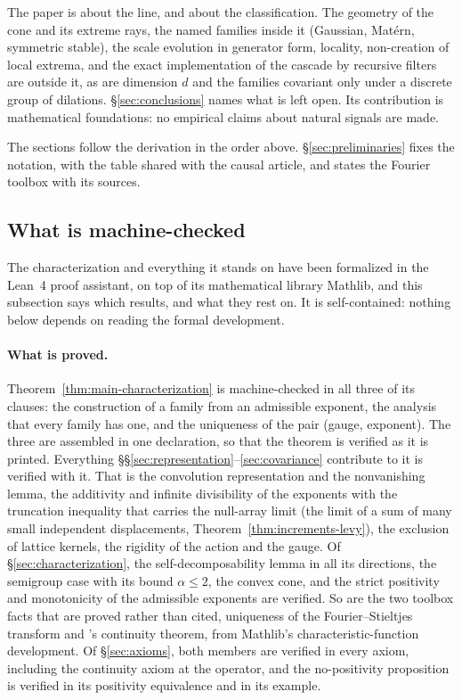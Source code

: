 The paper is about the line, and about the classification. The geometry of the cone and
its extreme rays, the named families inside it (Gaussian, Mat\'ern, symmetric stable),
the scale evolution in generator form, locality, non-creation of local extrema, and the
exact implementation of the cascade by recursive filters are outside it, as are dimension
$d$ and the families covariant only under a discrete group of dilations.
\S\ref{sec:conclusions} names what is left open. Its contribution is mathematical
foundations: no empirical claims about natural signals are made.

The sections follow the derivation in the order above. \S\ref{sec:preliminaries} fixes
the notation, with the table shared with the causal article, and states the Fourier
toolbox with its sources.

\subsection{What is machine-checked}\label{sec:machine-checked}

The characterization and everything it stands on have been formalized in the Lean~4 proof
assistant, on top of its mathematical library Mathlib, and this subsection says which
results, and what they rest on. It is self-contained: nothing below depends on
reading the formal development.

\paragraph{What is proved.} Theorem~\ref{thm:main-characterization} is machine-checked in
all three of its clauses: the construction of a family from an admissible exponent, the
analysis that every family has one, and the uniqueness of the pair (gauge, exponent). The
three are assembled in one declaration, so that the theorem is verified as it is printed.
Everything \S\S\ref{sec:representation}--\ref{sec:covariance} contribute to it is
verified with it. That is the convolution representation and the nonvanishing lemma, the
additivity and infinite divisibility of the exponents with the truncation inequality that
carries the null-array limit (the limit of a sum of many small independent displacements,
Theorem~\ref{thm:increments-levy}), the exclusion of lattice kernels, the
rigidity of the action and the gauge. Of \S\ref{sec:characterization}, the
self-decomposability lemma in all its directions, the semigroup case with its bound
$\alpha \le 2$, the convex cone, and the strict positivity and monotonicity of the
admissible exponents are verified. So are the two toolbox facts that are proved rather than
cited, uniqueness of the Fourier--Stieltjes transform and \Levy's continuity theorem, from
Mathlib's characteristic-function development. Of \S\ref{sec:axioms}, both members are
verified in every axiom, including the continuity axiom at the operator, and the
no-positivity proposition is verified in its positivity equivalence and in its example.

